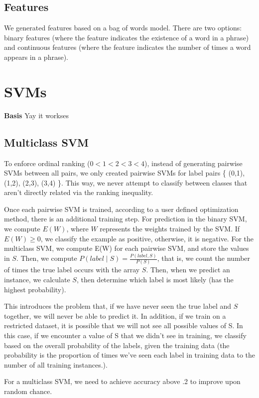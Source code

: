 \documentclass[letterpaper, 11pt]{article}
\begin{document}
\subsection{Features}
We generated features based on a bag of words model.  There are two options: binary features (where the feature indicates the existence of a word in a phrase) and continuous features (where the feature indicates the number of times a word appears in a phrase).

\section{SVMs}

\textbf{Basis} Yay it workses

\subsection{Multiclass SVM}
To enforce ordinal ranking ($0 < 1 < 2 < 3 < 4$), instead of generating pairwise SVMs between all pairs, we only created pairwise SVMs for label pairs \{ (0,1), (1,2), (2,3), (3,4) \}.  This way, we never attempt to classify between classes that aren't directly related via the ranking inequality.

Once each pairwise SVM is trained, according to a user defined optimization method, there is an additional training step.  For prediction in the binary SVM, we compute $E(W)$, where $W$ represents the weights trained by the SVM.  If $E(W) \ge 0$, we classify the example as positive, otherwise, it is negative.  For the multiclass SVM, we compute E(W) for each pairwise SVM, and store the values in $S$.  Then, we compute $P(label \mid S) = \frac{P(label, S)}{P(S)}$, that is, we count the number of times the true label occurs with the array $S$.  Then, when we predict an instance, we calculate $S$, then determine which label is most likely (has the highest probability).

This introduces the problem that, if we have never seen the true label and $S$ together, we will never be able to predict it.  In addition, if we train on a restricted dataset, it is possible that we will not see all possible values of S.  In this case, if we encounter a value of S that we didn't see in training, we classify based on the overall probability of the labels, given the training data (the probability is the proportion of times we've seen each label in training data to the number of all training instances.).

For a multiclass SVM, we need to achieve accuracy above .2 to improve upon random chance.
\end{document}
